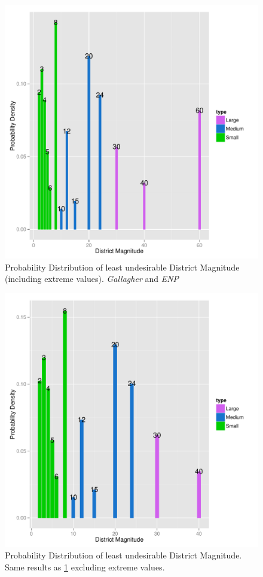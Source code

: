 \documentclass{article}
\begin{document}
\begin{figure}[]
\includegraphics[scale=1.00]{images/gallagher_enp_tradeoff_overall.pdf}
\caption{Probability Distribution of least undesirable District Magnitude (including extreme values). \emph {Gallagher} and \emph{ENP}}
\label{fig:optimal_results}
\end{figure}


\begin{figure}[]
\includegraphics[scale=1.00]{images/gallagher_enp_tradeoff_overall_small.pdf}
\caption{Probability Distribution of least undesirable District Magnitude. Same results as \ref{fig:optimal_results} excluding extreme values.}
\label{fig:optimal_results_small}
\end{figure}
\end{document}
